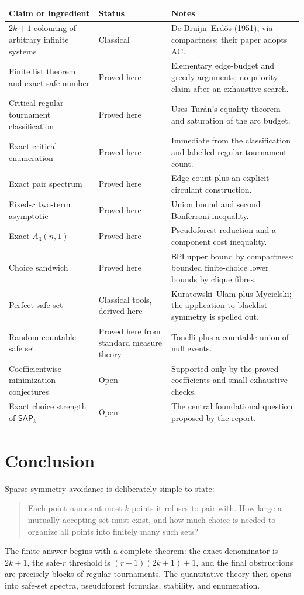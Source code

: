 \documentclass[11pt]{article}
\theoremstyle{definition}
\theoremstyle{remark}
\newcommand{\BPI}{\mathsf{BPI}}
\newcommand{\SAP}{\mathsf{SAP}}
\begin{document}
\begin{longtable}{p{}p{}p{}}
\toprule
Claim or ingredient & Status & Notes\\ \midrule
$2k+1$-colouring of arbitrary infinite systems & Classical &
De Bruijn--Erd\H{o}s (1951), via compactness; their paper adopts AC.\\
Finite list theorem and exact safe number & Proved here &
Elementary edge-budget and greedy arguments; no priority claim after an
exhaustive search.\\
Critical regular-tournament classification & Proved here &
Uses Tur\'an's equality theorem and saturation of the arc budget.\\
Exact critical enumeration & Proved here &
Immediate from the classification and labelled regular tournament count.\\
Exact pair spectrum & Proved here &
Edge count plus an explicit circulant construction.\\
Fixed-$r$ two-term asymptotic & Proved here &
Union bound and second Bonferroni inequality.\\
Exact $A_3(n,1)$ & Proved here &
Pseudoforest reduction and a component cost inequality.\\
Choice sandwich & Proved here &
$\BPI$ upper bound by compactness; bounded finite-choice lower bounds by
clique fibres.\\
Perfect safe set & Classical tools, derived here &
Kuratowski--Ulam plus Mycielski; the application to blacklist symmetry is
spelled out.\\
Random countable safe set & Proved here from standard measure theory &
Tonelli plus a countable union of null events.\\
Coefficientwise minimization conjectures & Open &
Supported only by the proved coefficients and small exhaustive checks.\\
Exact choice strength of $\SAP_k$ & Open &
The central foundational question proposed by the report.\\
\bottomrule
\end{longtable}

\section{Conclusion}

Sparse symmetry-avoidance is deliberately simple to state:
\begin{quote}
Each point names at most $k$ points it refuses to pair with.  How large a
mutually accepting set must exist, and how much choice is needed to organize
all points into finitely many such sets?
\end{quote}
The finite answer begins with a complete theorem: the exact denominator is
$2k+1$, the safe-$r$ threshold is $(r-1)(2k+1)+1$, and the final obstructions
are precisely blocks of regular tournaments.  The quantitative theory then
opens into safe-set spectra, pseudoforest formulas, stability, and
enumeration.
\end{document}
